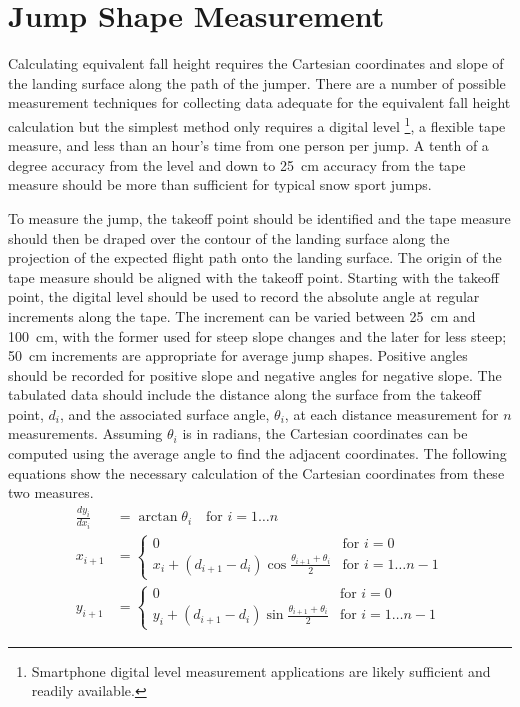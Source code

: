 \documentclass[smallextended]{svjour3}       %
\begin{document}
\section{Jump Shape Measurement}
\label{sec:jump-shape-measurement}
%
Calculating equivalent fall height requires the Cartesian coordinates and slope
of the landing surface along the path of the jumper. There are a number of
possible measurement techniques for collecting data adequate for the equivalent
fall height calculation but the simplest method only requires a digital level
\footnote{Smartphone digital level measurement applications are likely
sufficient and readily available.}, a flexible tape measure, and less than an
hour's time from one person per jump. A tenth of a degree accuracy from the
level and down to 25~\si{\centi\meter} accuracy from the tape measure should be
more than sufficient for typical snow sport jumps.

To measure the jump, the takeoff point should be identified and the tape
measure should then be draped over the contour of the landing surface along the
projection of the expected flight path onto the landing surface. The origin of
the tape measure should be aligned with the takeoff point. Starting with the
takeoff point, the digital level should be used to record the absolute angle at
regular increments along the tape. The increment can be varied between
25~\si{\centi\meter} and 100~\si{\centi\meter}, with the former used for steep
slope changes and the later for less steep; 50~\si{\centi\meter} increments are
appropriate for average jump shapes. Positive angles should be recorded for
positive slope and negative angles for negative slope. The tabulated data
should include the distance along the surface from the takeoff point, $d_i$,
and the associated surface angle, $\theta_i$, at each distance measurement for
$n$ measurements. Assuming $\theta_i$ is in radians, the Cartesian coordinates
can be computed using the average angle to find the adjacent coordinates. The
following equations show the necessary calculation of the Cartesian
coordinates from these two measures.
%
\begin{align}
  \frac{dy_i}{dx_i} & = \arctan{\theta_i} \quad \text{for } i=1\ldots n \\
  x_{i + 1} & =
  \begin{cases}
    0 & \text{for } i=0 \\
    x_i + (d_{i+1} - d_i)\cos{\frac{\theta_{i+1} + \theta_i}{2}} &  \text{for }
    i=1\ldots n-1
  \end{cases} \\
  y_{i + 1} & =
  \begin{cases}
    0 & \text{for } i=0 \\
    y_i + (d_{i+1} - d_i)\sin{\frac{\theta_{i+1} + \theta_i}{2}} &  \text{for }
    i=1\ldots n-1
  \end{cases}
\end{align}
\end{document}
